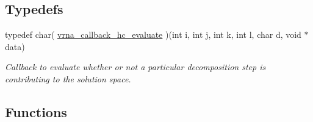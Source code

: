 \subsection*{Typedefs}
\begin{DoxyCompactItemize}
\item 
typedef char( \hyperlink{group__hard__constraints_gabe10e2b9d2498874bdfe0e0a4dffc246}{vrna\-\_\-callback\-\_\-hc\-\_\-evaluate} )(int i, int j, int k, int l, char d, void $\ast$data)
\begin{DoxyCompactList}\small\item\em Callback to evaluate whether or not a particular decomposition step is contributing to the solution space. \end{DoxyCompactList}\end{DoxyCompactItemize}
\subsection*{Functions}
